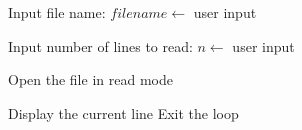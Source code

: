 \begin{algorithm}
\caption{Read and Display the First N Lines of a File}
\begin{algorithmic}[1]

\STATE Input file name:
\STATE $filename \gets$ user input

\STATE Input number of lines to read:
\STATE $n \gets$ user input

\STATE Open the file in read mode

        \STATE Display the current line
    \ELSE
        \STATE Exit the loop
    \ENDIF
\ENDFOR

\end{algorithmic}
\end{algorithm}